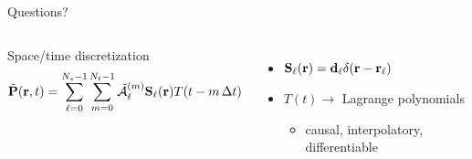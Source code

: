 \documentclass[aspectratio=169]{beamer}
\begin{document}
\begin{frame}[standout]
  Questions?
\end{frame}

\appendix

\begin{frame}
  \begin{columns}[T]
      \centering
      

      \begin{block}{Space/time discretization}
        \begin{equation*}
          \tilde{\vb{P}}(\vb{r}, t) = \sum_{\ell = 0}^{N_s - 1} \sum_{m = 0}^{N_t - 1} \tilde{\mathcal{A}}_\ell^{(m)}\vb{S}_\ell(\vb{r}) T(t - m \, \Delta t)
        \end{equation*}
      \end{block}
      \begin{itemize}
        \item $\vb{S}_\ell(\vb{r}) = \vb{d}_\ell \delta(\vb{r} - \vb{r}_\ell)$
        \item $T(t) \rightarrow$ Lagrange polynomials
          \begin{itemize}
            \item causal, interpolatory, differentiable
          \end{itemize}
      \end{itemize}
  \end{columns}
\end{frame}
\end{document}
